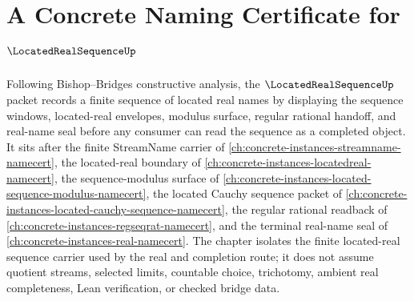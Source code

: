 \chapter{A Concrete Naming Certificate for $\LocatedRealSequenceUp$}
\label{ch:concrete-instances-located-real-sequence-namecert}

Following Bishop--Bridges constructive analysis, the $\LocatedRealSequenceUp$ packet records a finite sequence of located real names by displaying the sequence windows, located-real envelopes, modulus surface, regular rational handoff, and real-name seal before any consumer can read the sequence as a completed object. It sits after the finite StreamName carrier of \autoref{ch:concrete-instances-streamname-namecert}, the located-real boundary of \autoref{ch:concrete-instances-locatedreal-namecert}, the sequence-modulus surface of \autoref{ch:concrete-instances-located-sequence-modulus-namecert}, the located Cauchy sequence packet of \autoref{ch:concrete-instances-located-cauchy-sequence-namecert}, the regular rational readback of \autoref{ch:concrete-instances-regseqrat-namecert}, and the terminal real-name seal of \autoref{ch:concrete-instances-real-namecert}. The chapter isolates the finite located-real sequence carrier used by the real and completion route; it does not assume quotient streams, selected limits, countable choice, trichotomy, ambient real completeness, Lean verification, or checked bridge data.

